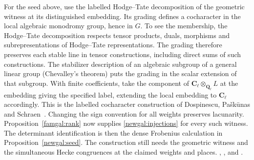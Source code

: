 For the seed above, use the labelled Hodge--Tate decomposition of the
geometric witness at its distinguished embedding. Its grading defines
a cocharacter in the local algebraic monodromy group, hence in \(G\).
To see the membership, the Hodge--Tate decomposition respects tensor
products, duals, morphisms and subrepresentations of Hodge--Tate
representations. The grading therefore preserves each stable line in
tensor constructions, including direct sums of such constructions.
The stabilizer description of an algebraic subgroup of a general linear
group (Chevalley's theorem) puts the grading in the scalar extension of
that subgroup. With finite coefficients, take the component of
\(\mathbf C_\ell\otimes_{\mathbf Q_\ell}L\) at the embedding giving the
specified label, extending the local embedding to \(\mathbf C_\ell\)
accordingly. This is the labelled cocharacter construction of
Dospinescu, Pa\v{s}k\=unas and Schraen~\cite{senCharacters}.
Changing the sign convention for all weights preserves lacunarity.
Proposition~\ref{famgal:rank} now supplies \eqref{newgal:injections}
for every such witness. The determinant identification is then the
dense Frobenius calculation in Proposition~\ref{newgal:seed}.
The construction still needs the geometric witness and the simultaneous
Hecke congruences at the claimed weights and places.
,
, and
.
